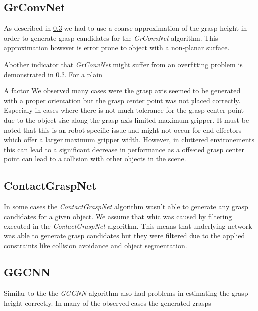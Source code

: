 \subsection{GrConvNet}
As described in \ref{} we had to use a coarse approximation of the grasp height in order to generate grasp candidates for the \textit{GrConvNet} algorithm.
This approximation however is error prone to object with a non-planar surface.

Abother indicator that \textit{GrConvNet} might suffer from an overfitting problem is demonstrated in \ref{}.
For a plain

A factor
We observed many cases were the grasp axis seemed to be generated with a proper orientation but the grasp center point was not placed correctly.
Especialy in cases where there is not much tolerance for the grasp center point due to the object size along the grasp axis limited maximum gripper.
It must be noted that this is an robot specific issue and might not occur for end effectors which offer a larger maximum gripper width.
However, in cluttered environements this can lead to a significant decrease in performance as a offseted grasp center point can lead to a collision
with other objects in the scene.

\subsection{ContactGraspNet}
In some cases the \textit{ContactGraspNet} algorithm wasn't able to generate any grasp candidates for a given object.
We assume that whic was caused by filtering executed in the \textit{ContactGraspNet} algorithm.
This means that underlying network was able to generate grasp candidates but they were filtered due to the applied constraints like collision avoidance
and object segmentation.


\subsection{GGCNN}
Similar to the  the \textit{GGCNN} algorithm also had problems in estimating the grasp height correctly.
In many of the observed cases the generated grasps